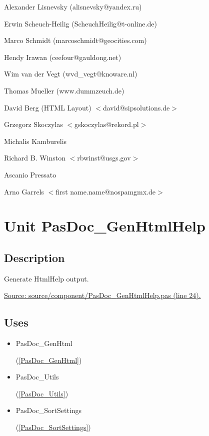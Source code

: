 \documentclass{report}
\begin{document}
\par
Alexander Lisnevsky (alisnevsky@yandex.ru)

\par
Erwin Scheuch-Heilig (ScheuchHeilig@t-online.de)

\par
Marco Schmidt (marcoschmidt@geocities.com)

\par
Hendy Irawan (ceefour@gauldong.net)

\par
Wim van der Vegt (wvd{\_}vegt@knoware.nl)

\par
Thomas Mueller (www.dummzeuch.de)

\par
David Berg (HTML Layout) {$<$}david@sipsolutions.de{$>$}

\par
Grzegorz Skoczylas {$<$}gskoczylas@rekord.pl{$>$}

\par
Michalis Kamburelis

\par
Richard B. Winston {$<$}rbwinst@usgs.gov{$>$}

\par
Ascanio Pressato

\par
Arno Garrels {$<$}first name.name@nospamgmx.de{$>$}

\chapter{Unit PasDoc{\_}GenHtmlHelp}
\label{PasDoc_GenHtmlHelp}
\section{Description}
Generate HtmlHelp output.\par
\href{https://github.com/pasdoc/pasdoc/blob/master/source/component/PasDoc_GenHtmlHelp.pas#L24}{Source: source/component/PasDoc{\_}GenHtmlHelp.pas (line 24).}
\section{Uses}
\begin{itemize}
\item \begin{ttfamily}PasDoc{\_}GenHtml\end{ttfamily}(\ref{PasDoc_GenHtml})\item \begin{ttfamily}PasDoc{\_}Utils\end{ttfamily}(\ref{PasDoc_Utils})\item \begin{ttfamily}PasDoc{\_}SortSettings\end{ttfamily}(\ref{PasDoc_SortSettings})\end{itemize}
\end{document}
